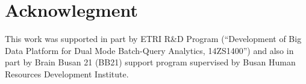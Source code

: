 \section{Acknowlegment}

This work was supported in part by ETRI R\&D Program (“Development of Big Data Platform for Dual Mode Batch-Query Analytics, 14ZS1400”) and also in part by Brain Busan 21 (BB21) support program supervised by Busan Human Resources Development Institute.